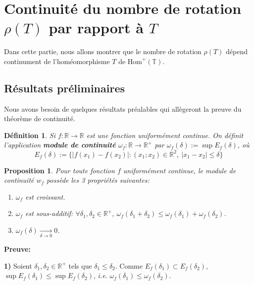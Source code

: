 \documentclass[11pt,a4 paper]{article}
\newtheorem{definition}[theoreme]{Définition}
\newtheorem{propriete}[theoreme]{Proposition}
\newcommand{\Tbb}{\mathbb{T}}
\newenvironment{defi}{\begin{box_defi}\begin{definition}}{\end{definition}\end{box_defi}}
\newenvironment{ppt}{\begin{box_ppt}\begin{propriete}}{\end{propriete}\end{box_ppt}}
\begin{document}
	
	
\newpage

	
\section{Continuité du nombre de rotation $\rho(T)$ par rapport à $T$}

Dans cette partie, nous allons montrer que le nombre de rotation $\rho(T)$ dépend continument de l'homéomorphisme $T$ de $\mathrm{Hom}^+(\Tbb)$. 

\subsection{Résultats préliminaires}

Nous avons besoin de quelques résultats préalables qui allègeront la preuve du théorème de continuité. 
\begin{defi}
		Si $f:\mathbb{R} \to \mathbb{R}$ est une fonction uniformément continue. On définit l'application \textbf{module de continuité} $\omega_f: \mathbb{R} \to \mathbb{R}^+$ par $\omega_f(\delta) := \sup E_{f}(\delta)$, où
		$$E_{f}(\delta):=\lbrace |f(x_1) - f(x_2)|: (x_1;x_2) \in \mathbb{R}^2,\ |x_1 - x_2| \leq \delta \rbrace$$
\end{defi}









\begin{ppt}\label{modulecont}
		Pour toute fonction $f$ uniformément continue, le  module de continuité $w_f$ possède les 3 propriétés suivantes:
	\begin{enumerate}
		\item $\omega_f$ est croissant.
		\item $\omega_f$ est sous-additif: $\forall \delta_1, \delta_2 \in \mathbb{R}^+$, $\omega_f(\delta_1 + \delta_2) \leq \omega_f(\delta_1) +\omega_f(\delta_2)$.
		\item $\omega_f(\delta) \underset{\delta \to 0}{\longrightarrow}0$.
	\end{enumerate}
\end{ppt}		
	


	\textbf{Preuve:}
	\par \textbf{1)} Soient $\delta_1,\delta_2 \in \mathbb{R}^+$ tels que $\delta_1\leq \delta_2$. Comme $E_f(\delta_1)\subset E_f(\delta_2)$, $\sup E_f(\delta_1)\leq \sup E_f(\delta_2)$, \textit{i.e.} $\omega_f(\delta_1)\leq \omega_f(\delta_2)$.\\
	
\end{document}
